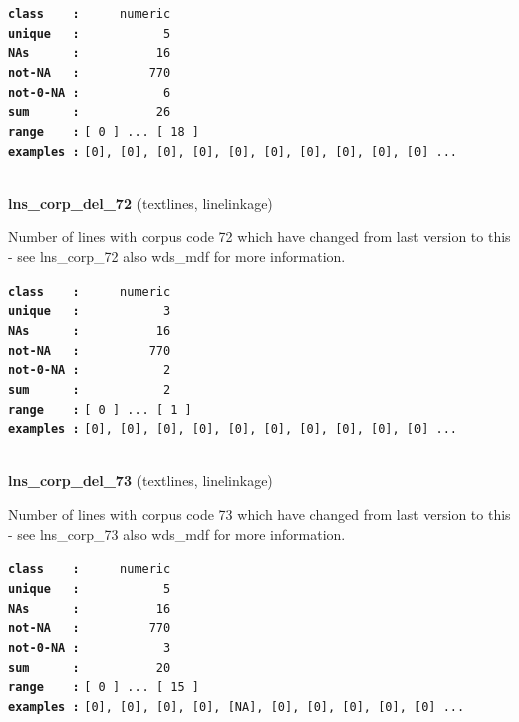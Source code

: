 \documentclass[]{article}
\begin{document}
\textbf{\texttt{class\ \ \ \ :}} \texttt{~~~~~numeric}\\
\textbf{\texttt{unique\ \ \ :}} \texttt{~~~~~~~~~~~5}\\
\textbf{\texttt{NAs\ \ \ \ \ \ :}} \texttt{~~~~~~~~~~16}\\
\textbf{\texttt{not-NA\ \ \ :}} \texttt{~~~~~~~~~770}\\
\textbf{\texttt{not-0-NA\ :}} \texttt{~~~~~~~~~~~6}\\
\textbf{\texttt{sum\ \ \ \ \ \ :}} \texttt{~~~~~~~~~~26}\\
\textbf{\texttt{range\ \ \ \ :}}
\texttt{{[}\ 0\ {]}\ ...\ {[}\ 18\ {]}}\\
\textbf{\texttt{examples\ :}}
\texttt{{[}0{]},\ {[}0{]},\ {[}0{]},\ {[}0{]},\ {[}0{]},\ {[}0{]},\ {[}0{]},\ {[}0{]},\ {[}0{]},\ {[}0{]}\ ...}\\

~

\textbf{lns\_corp\_del\_72} (textlines, linelinkage)

Number of lines with corpus code 72 which have changed from last version
to this - see lns\_corp\_72 also wds\_mdf for more information.

\textbf{\texttt{class\ \ \ \ :}} \texttt{~~~~~numeric}\\
\textbf{\texttt{unique\ \ \ :}} \texttt{~~~~~~~~~~~3}\\
\textbf{\texttt{NAs\ \ \ \ \ \ :}} \texttt{~~~~~~~~~~16}\\
\textbf{\texttt{not-NA\ \ \ :}} \texttt{~~~~~~~~~770}\\
\textbf{\texttt{not-0-NA\ :}} \texttt{~~~~~~~~~~~2}\\
\textbf{\texttt{sum\ \ \ \ \ \ :}} \texttt{~~~~~~~~~~~2}\\
\textbf{\texttt{range\ \ \ \ :}}
\texttt{{[}\ 0\ {]}\ ...\ {[}\ 1\ {]}}\\
\textbf{\texttt{examples\ :}}
\texttt{{[}0{]},\ {[}0{]},\ {[}0{]},\ {[}0{]},\ {[}0{]},\ {[}0{]},\ {[}0{]},\ {[}0{]},\ {[}0{]},\ {[}0{]}\ ...}\\

~

\textbf{lns\_corp\_del\_73} (textlines, linelinkage)

Number of lines with corpus code 73 which have changed from last version
to this - see lns\_corp\_73 also wds\_mdf for more information.

\textbf{\texttt{class\ \ \ \ :}} \texttt{~~~~~numeric}\\
\textbf{\texttt{unique\ \ \ :}} \texttt{~~~~~~~~~~~5}\\
\textbf{\texttt{NAs\ \ \ \ \ \ :}} \texttt{~~~~~~~~~~16}\\
\textbf{\texttt{not-NA\ \ \ :}} \texttt{~~~~~~~~~770}\\
\textbf{\texttt{not-0-NA\ :}} \texttt{~~~~~~~~~~~3}\\
\textbf{\texttt{sum\ \ \ \ \ \ :}} \texttt{~~~~~~~~~~20}\\
\textbf{\texttt{range\ \ \ \ :}}
\texttt{{[}\ 0\ {]}\ ...\ {[}\ 15\ {]}}\\
\textbf{\texttt{examples\ :}}
\texttt{{[}0{]},\ {[}0{]},\ {[}0{]},\ {[}0{]},\ {[}NA{]},\ {[}0{]},\ {[}0{]},\ {[}0{]},\ {[}0{]},\ {[}0{]}\ ...}\\
\end{document}
